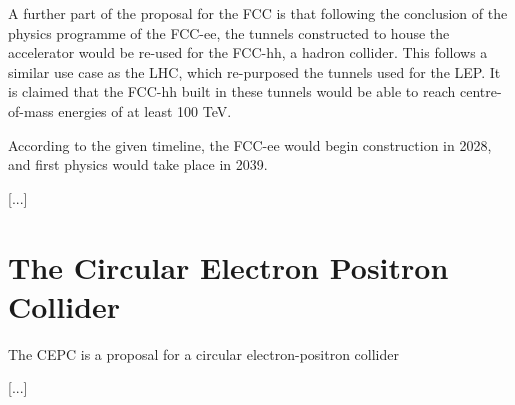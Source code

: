 A further part of the proposal for the FCC is that following the conclusion of the physics programme of the FCC-ee, the tunnels constructed to house the accelerator would be re-used for the FCC-hh, a hadron collider. This follows a similar use case as the LHC, which re-purposed the tunnels used for the \acrfull{LEP}. It is claimed that the FCC-hh built in these tunnels would be able to reach centre-of-mass energies of at least 100 TeV.

According to the given timeline, the FCC-ee would begin construction in 2028, and first physics would take place in 2039. 


[...]

\section{The Circular Electron Positron Collider}

The \acrfull{CEPC} is a proposal for a circular electron-positron collider 

[...]